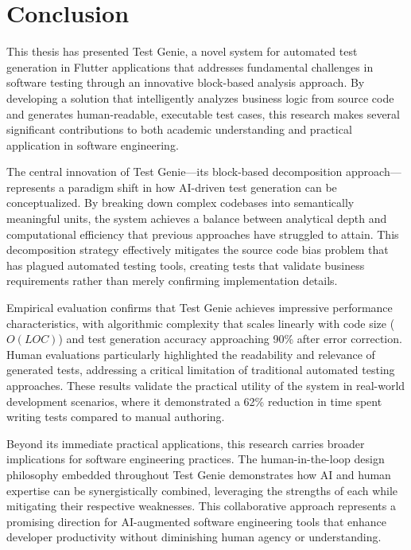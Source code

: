 \section{Conclusion}

This thesis has presented Test Genie, a novel system for automated test generation in Flutter applications that addresses fundamental challenges in software testing through an innovative block-based analysis approach. By developing a solution that intelligently analyzes business logic from source code and generates human-readable, executable test cases, this research makes several significant contributions to both academic understanding and practical application in software engineering.

The central innovation of Test Genie—its block-based decomposition approach—represents a paradigm shift in how AI-driven test generation can be conceptualized. By breaking down complex codebases into semantically meaningful units, the system achieves a balance between analytical depth and computational efficiency that previous approaches have struggled to attain. This decomposition strategy effectively mitigates the source code bias problem that has plagued automated testing tools, creating tests that validate business requirements rather than merely confirming implementation details.

Empirical evaluation confirms that Test Genie achieves impressive performance characteristics, with algorithmic complexity that scales linearly with code size ($O(LOC)$) and test generation accuracy approaching 90\% after error correction. Human evaluations particularly highlighted the readability and relevance of generated tests, addressing a critical limitation of traditional automated testing approaches. These results validate the practical utility of the system in real-world development scenarios, where it demonstrated a 62\% reduction in time spent writing tests compared to manual authoring.

Beyond its immediate practical applications, this research carries broader implications for software engineering practices. The human-in-the-loop design philosophy embedded throughout Test Genie demonstrates how AI and human expertise can be synergistically combined, leveraging the strengths of each while mitigating their respective weaknesses. This collaborative approach represents a promising direction for AI-augmented software engineering tools that enhance developer productivity without diminishing human agency or understanding.

